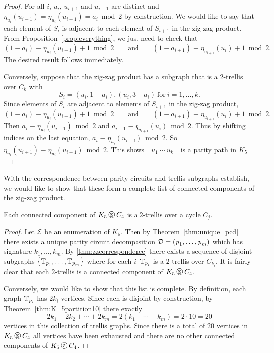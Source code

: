 \begin{proof}

For all $i$, $u_i$, $u_{i+1}$ and $u_{i-1}$ are distinct and $\eta_{u_i}(u_{i-1}) = \eta_{u_i} ( u_{i+1}) = a_i \bmod{2}$ by construction. We would like to say that each element of $S_i$ is adjacent to each element of $S_{i+1}$ in the zig-zag product. From Proposition~\ref{prop:everything}, we just need to check that \[ \left(1-a_i\right) \equiv \eta_{u_i}(u_{i+1}) +1 \bmod{2} \qquad \textrm{and} \qquad \left(1-a_{i+1}\right) \equiv \eta_{u_{i+1}}(u_{i}) +1 \bmod{2}.\] The desired result follows immediately.

Conversely, suppose that the zig-zag product has a subgraph that is a  $2$-trellis over $C_k$ with \[S_i = { (u_i, 1-a_i), (u_i, 3-a_i)}\  \textrm{for}\  i =1,\ldots,k.\] Since elements of $S_i$ are adjacent to elements of $S_{i+1}$ in the zig-zag product, \[\left(1-a_i\right) \equiv \eta_{u_i}(u_{i+1}) +1 \bmod{2}\qquad \textrm{and}\qquad \left(1-a_{i+1}\right) \equiv \eta_{u_{i+1}}(u_{i}) +1 \bmod{2}.\] Then $a_i \equiv \eta_{u_i} (u_{i+1}) \bmod{2}$ and $a_{i+1} \equiv \eta_{u_{i+1}}(u_i) \bmod{2}$. Thus by shifting indices on the last equation, $a_{i} \equiv \eta_{u_{i}}(u_{i-1}) \bmod{2}$. So $\eta_{u_i}(u_{i+1}) \equiv  \eta_{u_i} (u_{i-1}) \bmod{2}$.
This shows $\left[u_1\ \cdots\  u_k\right]$ is a parity path in $K_5$
\end{proof}

With the correspondence between parity circuits and trellis subgraphs establish, we would like to show that these form a complete list of connected components of the zig-zag product. 
\begin{theorem}
\label{thm:final_theorem}
Each connected component of $K_5 \zigzag C_4$ is a $2$-trellis over a cycle $C_j$.
\end{theorem}

\begin{proof}

Let $\operatorname{\mathcal{E}}$ be an enumeration of $K_5$. Then by Theorem~\ref{thm:unique_pcd} there exists a unique parity circuit decomposition $\operatorname{\mathcal{D}} = \left( \operatorname{\mathit{p}}_1, \ldots, \operatorname{\mathit{p}}_m \right)$ which has signature $k_1,\ldots,k_m$. By \ref{thm:zzcorrespondence} there exists a sequence of disjoint subgraphs $\left\{ \operatorname{\mathbb{T}}_{\operatorname{\mathit{p}}_1},\ldots, \operatorname{\mathbb{T}}_{\operatorname{\mathit{p}}_m}\right\}$ where for each $i$,  $\operatorname{\mathbb{T}}_{\operatorname{\mathit{p}}_i}$ is a $2$-trellis over $C_{k_i}$. It is fairly clear that each $2$-trellis is a connected component of $K_5 \zigzag C_4$.

 Conversely, we would like to show that this list is complete. By definition, each graph $\operatorname{\mathbb{T}}_{\operatorname{\mathit{p}}_i}$ has $2k_i$ vertices. Since each is disjoint by construction, by Theorem~\ref{thm:K_5partition10} there exactly \[ 2k_1 + 2k_2 +\cdots+ 2k_m = 2(k_1 + \cdots + k_m) = 2 \cdot 10 = 20\] vertices in this collection of trellis graphs. Since there is a total of $20$ vertices in $K_5 \zigzag C_4$ all vertices have been exhausted and there are no other connected components of $K_5 \zigzag C_4$. 
\end{proof}

